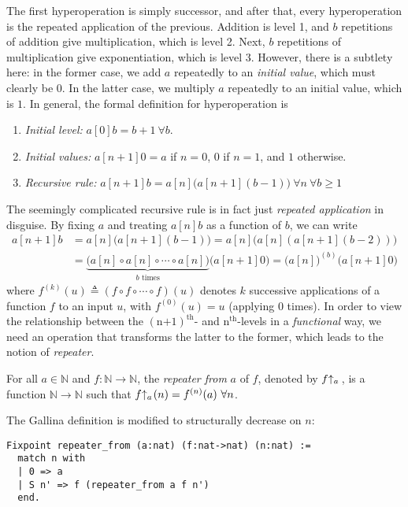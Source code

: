 The first hyperoperation is simply successor, and after that, 
every hyperoperation is the repeated application of the previous. 
Addition is level 1, and $b$ repetitions of addition
give multiplication, which is level 2. Next, $b$ repetitions of 
multiplication give exponentiation, which is level 3. However, 
there is a subtlety here: in the former case, we add $a$ 
repeatedly to an \textit{initial value}, which must clearly be $0$. 
In the latter case, we multiply $a$ repeatedly to an initial value, 
which is $1$. In general, the formal definition for hyperoperation is
\begin{enumerate}
	\item \textit{Initial level:} $a[0]b = b + 1 \ \forall b$.
	\item \textit{Initial values:} $a[n+1]0 = a$ if $n = 0$, $0$ if $n = 1$, and $1$ otherwise.
	\item \textit{Recursive rule:} $ a[n+1]b = a[n]\big(a[n+1](b - 1)\big) \ \forall n \ \forall b \ge 1$
\end{enumerate}
The seemingly complicated recursive rule is in fact just \emph{repeated application} in disguise. By fixing $a$ and treating $a[n]b$ as a function of $b$, we can write
\begin{equation*}
\begin{aligned}
a[n+1]b & = a[n]\big(a[n+1](b-1)\big) = a[n]\big(a[n](a[n+1](b-2))\big) \\
 & =  \underbrace{\big( a[n]\circ a[n]\circ \cdots \circ a[n] \big)}_{b \text{ times}} \big(a[n+1]0\big) = \big(a[n]\big)^{(b)}\big(a[n+1]0\big)
\end{aligned}
\end{equation*}
where $f^{(k)}(u) \triangleq (f\circ f\circ \cdots \circ f)(u)$ denotes $k$ successive applications of a function $f$ to an input $u$, with $f^{(0)}(u) = u $ (applying $0$ times). In order to view the relationship between the $(\text{n+1})^{\text{th}}$- and $\text{n}^{\text{th}}$-levels in a \emph{functional} way, we need an operation that transforms the latter to the former, which leads to the notion of \emph{repeater}.
\begin{defn}
For all $a\in \mathbb{N}$ and $f: \mathbb{N}\to \mathbb{N}$, the \emph{repeater from} $a$ of $f$, denoted by $\rf{f}{a}$ , is a function $\mathbb{N}\to \mathbb{N}$ such that $\rf{f}{a}(n) = f^{(n)}(a) \ \forall n$.
\end{defn}
The Gallina definition is modified to structurally decrease on $n$:
\begin{lstlisting}
Fixpoint repeater_from (a:nat) (f:nat->nat) (n:nat) := 
  match n with
  | 0 => a
  | S n' => f (repeater_from a f n')
  end. 
\end{lstlisting}
